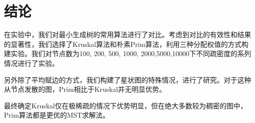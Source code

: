 \documentclass[UTF8]{ctexart}
\begin{document}
\section{结论}
在实验中，我们对最小生成树的常用算法进行了对比。考虑到对比的有效性和结果的显著性，我们选择了Kruskal算法和朴素Prim算法，利用三种分配权值的方式构建实验。我们对节点数为100, 200, 500, 1000, 2000,5000,10000下不同疏密度的系列情况进行了实验。

另外除了平均赋边的方式，我们构建了星状图的特殊情况，进行了研究。对于这种从节点发散的图，Prim相比于Kruskal并无明显优势。

最终确定Kruskal仅在极稀疏的情况下优势明显，但在绝大多数较为稠密的图中，Prim算法都是更优的MST求解法。

% 

\end{document}
